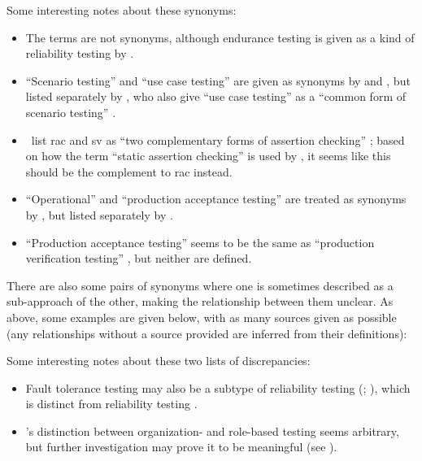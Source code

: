 Some interesting notes about these synonyms:
\begin{itemize}
      \item The terms are not synonyms, although endurance testing is given
            as a kind of reliability testing by \citet[p.~55]{Firesmith2015}.
      \item ``Scenario testing'' and ``use case testing'' are given as synonyms
            by \citetISTQB{} and \citet[pp.~47-49]{Kam2008}, but listed
            separately by \citet[p.~22]{IEEE2022}, who also give ``use case
            testing'' as a ``common form of scenario testing''
            \citeyearpar[p.~20]{IEEE2021}.
      \item \citeauthor{ChalinEtAl2006}~list \acf{rac} and \acf{sv} as ``two
            complementary forms of assertion checking''
            \citeyearpar[p.~343]{ChalinEtAl2006}; based on how the term ``static
            assertion checking'' is used by \citet[p.~345]{LahiriEtAl2013}, it
            seems like this should be the complement to \acs{rac} instead.
      \item ``Operational'' and ``production acceptance testing'' are treated
            as synonyms by \citetISTQB{}, but listed separately by
            \citet[p.~30]{Firesmith2015}.
      \item ``Production acceptance testing'' \citep[p.~30]{Firesmith2015}
            seems to be the same as ``production verification testing''
            \citep[p.~22]{IEEE2022}, but neither are defined.
\end{itemize}

There are also some pairs of synonyms where one is sometimes described as a
sub-approach of the other, making the relationship between them unclear. As
above, some examples are given below, with as many sources given as possible
(any relationships without a source provided are inferred from their
definitions):



Some interesting notes about these two lists of discrepancies:

\begin{itemize}
      \item Fault tolerance testing may also be a
            subtype of reliability testing
            (\citealp[p.~375]{IEEE2017}; \citealp[p.~7-10]{SWEBOK2024}), which
            is distinct from reliability testing \citep[p.~53]{Firesmith2015}.
      \item \citeauthor{Firesmith2015}'s distinction between organization-
            and role-based testing \citeyearpar[pp.~17,~37,~39]{Firesmith2015}
            seems arbitrary, but further investigation may prove it to be
            meaningful (see ).
\end{itemize}

